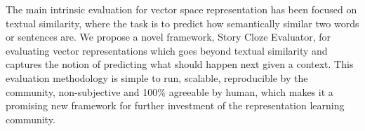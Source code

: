 The main intrinsic evaluation for vector space representation has been focused on textual similarity, where the task is to predict how semantically similar two words or sentences are. We propose a novel framework, Story Cloze Evaluator, for evaluating vector representations which goes beyond textual similarity and captures the notion of predicting what should happen next given a context. This evaluation methodology is simple to run, scalable, reproducible by the community, non-subjective and 100\% agreeable by human, which makes it a promising new framework for further investment of the representation learning community.
